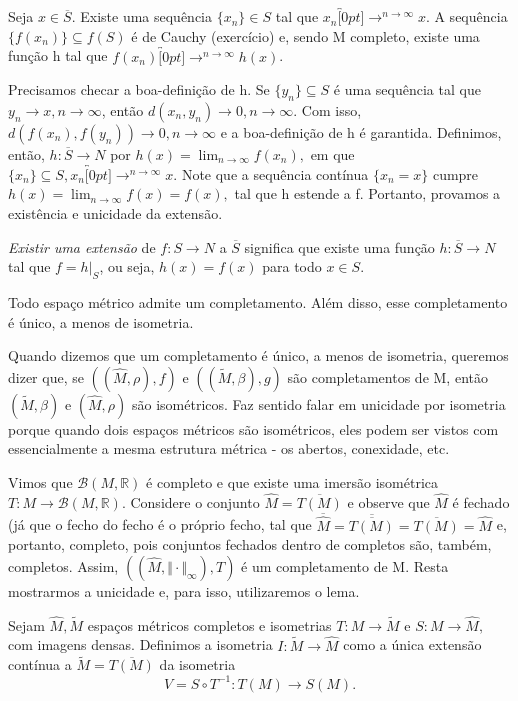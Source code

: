 \documentclass[MetricSpaces/metric_notes.tex]{subfiles}
\begin{document}
\begin{proof*}
	Seja \(x\in \overline{S}.\) Existe uma sequência \(\{x_{n}\}\in S\) tal que \(x_{n}\overbracket[0pt]{\longrightarrow}^{n\to \infty}x\). A sequência \(\{f(x_{n})\}\subseteq{f(S)}\)
	é de Cauchy (exercício) e, sendo M completo, existe uma função h tal que \(f(x_{n})\overbracket[0pt]{\longrightarrow}^{n\to \infty}h(x)\).

	Precisamos checar a boa-definição de h. Se \(\{y_{n}\}\subseteq{S}\) é uma sequência tal que \(y_{n}\longrightarrow x, n\rightarrow \infty\), então \(d(x_{n}, y_{n})\longrightarrow 0, n\rightarrow \infty\).
	Com isso, \(d(f(x_{n}), f(y_{n}))\longrightarrow 0, n\rightarrow \infty\) e a boa-definição de h é garantida. Definimos, então, \(h:\overline{S}\rightarrow N\) por
	\(h(x) = \lim_{n\to \infty}f(x_{n}),\) em que \(\{x_{n}\}\subseteq{S}, x_{n}\overbracket[0pt]{\longrightarrow}^{n\to \infty}x.\) Note que a sequência contínua
	\(\{x_{n} = x\}\) cumpre \(h(x) = \lim_{n\to \infty}f(x) = f(x),\) tal que h estende a f. Portanto, provamos a existência e unicidade da extensão. \qedsymbol
\end{proof*}
\textit{Existir uma extensão} de \(f:S\rightarrow N\) a \(\overline{S}\) significa que existe uma função \(h:\overline{S}\rightarrow N\) tal que \(f = h |_S\), ou seja,
\(h(x) = f(x)\) para todo \(x\in S\).
\begin{theorem*}
	Todo espaço métrico admite um completamento. Além disso, esse completamento é único, a menos de isometria.
\end{theorem*}
Quando dizemos que um completamento é único, a menos de isometria, queremos dizer que, se \(((\hat{M}, \rho ), f)\) e \(((\tilde{M}, \beta ), g)\) são completamentos de M,
então \((\tilde{M}, \beta )\) e \((\hat{M}, \rho )\) são isométricos. Faz sentido falar em unicidade por isometria porque quando dois espaços métricos são isométricos, eles podem
ser vistos com essencialmente a mesma estrutura métrica - os abertos, conexidade, etc.
\begin{proof*}
	Vimos que \(\mathcal{B}(M, \mathbb{R})\) é completo e que existe uma imersão isométrica \(T:M\rightarrow \mathcal{B}(M, \mathbb{R}).\) Considere o conjunto \(\hat{M} = \overline{T(M)}\)
	e observe que \(\hat{M}\) é fechado (já que o fecho do fecho é o próprio fecho, tal que \(\overline{\hat{M}} = \overline{\overline{T(M)}} = \overline{T(M)} = \hat{M}\) e, portanto,
	completo, pois conjuntos fechados dentro de completos são, também, completos. Assim, \(((\hat{M}, \Vert \cdot \Vert _{\infty}), T)\) é um completamento de M. Resta mostrarmos a unicidade e, para
	isso, utilizaremos o lema.

	Sejam \(\hat{M}, \tilde{M}\) espaços métricos completos e isometrias \(T:M\rightarrow \tilde{M}\) e \(S:M\rightarrow \hat{M},\) com imagens densas. Definimos a isometria
	\(I:\tilde{M}\rightarrow \hat{M}\) como a única extensão contínua a \(\tilde{M} = \overline{T(M)}\) da isometria
	\[
		V = S \circ{T^{-1}}:T(M)\rightarrow S(M).
	\]
\end{proof*}
\end{document}
